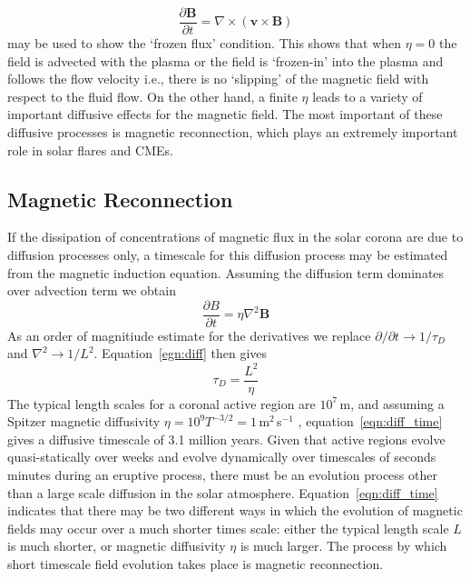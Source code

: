 \begin{equation}
\frac{\partial \mathbf{B}}{\partial t} = \nabla \times(\mathbf{v}\times \mathbf{B})
\end{equation}
may be used to show the \textquoteleft frozen flux' condition. This shows that when $\eta = 0$ the field is advected with the plasma or the field is \textquoteleft frozen-in' into the plasma and follows the flow velocity i.e., there is no `slipping' of the magnetic field with respect to the fluid flow.  On the other hand, a finite $\eta$ leads to a variety of important diffusive effects for the magnetic field. The most important of these diffusive processes is magnetic reconnection, which plays an extremely important role in solar flares and CMEs.



\subsection{Magnetic Reconnection}\label{sec:13}

If the dissipation of concentrations of magnetic flux in the solar corona are due to diffusion processes only, a timescale for this diffusion process may be estimated from the magnetic induction equation. Assuming the diffusion term dominates over advection term we obtain
\begin{equation}
\frac{\partial B}{\partial t} = \eta\nabla^2\mathbf{B}
\label{egn:diff}
\end{equation}
As an order of magnitiude estimate for the derivatives we replace $\partial/\partial t \rightarrow 1/\tau_D$ and $\nabla^2 \rightarrow 1/L^2$. Equation~\ref{egn:diff} then gives
\begin{equation}
\tau_D = \frac{L^2}{\eta}
\label{eqn:diff_time}
\end{equation}
The typical length scales for a coronal active region are $10^7$\,m, and assuming a Spitzer magnetic diffusivity $\eta = 10^9T^{-3/2} = 1$\,m$^2$\,s$^{-1}$ \citep{spitzer1962}, equation~\ref{eqn:diff_time} gives a diffusive timescale of 3.1 million years.
Given that active regions evolve quasi-statically over weeks and evolve dynamically over timescales of seconds minutes during an eruptive process, there must be an evolution process other than a large scale diffusion in the solar atmosphere. Equation~\ref{eqn:diff_time} indicates that there may be two different ways in which the evolution of magnetic fields may occur over a much shorter times scale: either the typical length scale $L$ is much shorter, or magnetic diffusivity $\eta$ is much larger. The process by which short timescale field evolution takes place is magnetic reconnection.

